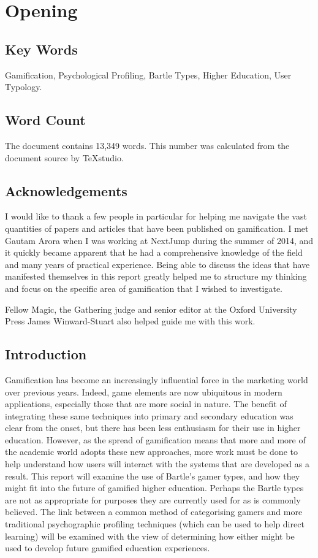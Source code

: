 \documentclass[12pt,a4paper,twoside]{report}
\begin{document}
\chapter{Opening}
\section{Key Words}
Gamification, Psychological Profiling, Bartle Types, Higher Education, User Typology.

\section{Word Count}
The document contains 13,349 words. This number was calculated from the document source by TeXstudio.

\section{Acknowledgements}
I would like to thank a few people in particular for helping me navigate the vast quantities of papers and articles that have been published on gamification. I met Gautam Arora when I was working at NextJump during the summer of 2014, and it quickly became apparent that he had a comprehensive knowledge of the field and many years of practical experience. Being able to discuss the ideas that have manifested themselves in this report greatly helped me to structure my thinking and focus on the specific area of gamification that I wished to investigate.

Fellow Magic, the Gathering judge and senior editor at the Oxford University Press James Winward-Stuart also helped guide me with this work.

\section{Introduction}
Gamification has become an increasingly influential force in the marketing world over previous years. Indeed, game elements are now ubiquitous in modern applications, especially those that are more social in nature. The benefit of integrating these same techniques into primary and secondary education was clear from the onset, but there has been less enthusiasm for their use in higher education. However, as the spread of gamification means that more and more of the academic world adopts these new approaches, more work must be done to help understand how users will interact with the systems that are developed as a result. This report will examine the use of Bartle's gamer types, and how they might fit into the future of gamified higher education. Perhaps the Bartle types are not as appropriate for purposes they are currently used for as is commonly believed. The link between a common method of categorising gamers and more traditional psychographic profiling techniques (which can be used to help direct learning) will be examined with the view of determining how either might be used to develop future gamified education experiences.
\end{document}
